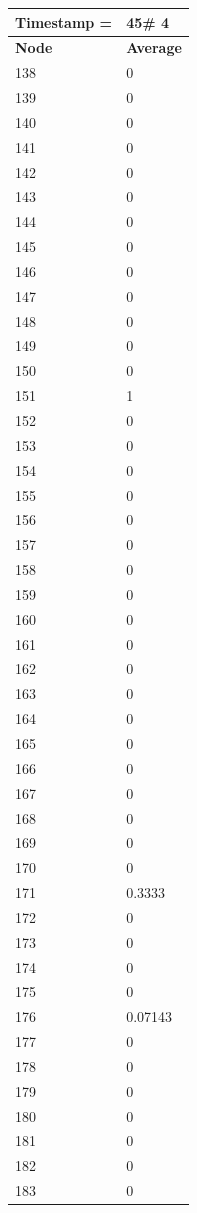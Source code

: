 \begin{tabular}{|l||l|}
\hline
\textbf{Timestamp =} & \textbf{45}\# 4\\\hline
	\textbf{Node} & \textbf{Average} \\ \hline
\hline
	138 & 0 \\ \hline
	139 & 0 \\ \hline
	140 & 0 \\ \hline
	141 & 0 \\ \hline
	142 & 0 \\ \hline
	143 & 0 \\ \hline
	144 & 0 \\ \hline
	145 & 0 \\ \hline
	146 & 0 \\ \hline
	147 & 0 \\ \hline
	148 & 0 \\ \hline
	149 & 0 \\ \hline
	150 & 0 \\ \hline
	151 & 1 \\ \hline
	152 & 0 \\ \hline
	153 & 0 \\ \hline
	154 & 0 \\ \hline
	155 & 0 \\ \hline
	156 & 0 \\ \hline
	157 & 0 \\ \hline
	158 & 0 \\ \hline
	159 & 0 \\ \hline
	160 & 0 \\ \hline
	161 & 0 \\ \hline
	162 & 0 \\ \hline
	163 & 0 \\ \hline
	164 & 0 \\ \hline
	165 & 0 \\ \hline
	166 & 0 \\ \hline
	167 & 0 \\ \hline
	168 & 0 \\ \hline
	169 & 0 \\ \hline
	170 & 0 \\ \hline
	171 & 0.3333 \\ \hline
	172 & 0 \\ \hline
	173 & 0 \\ \hline
	174 & 0 \\ \hline
	175 & 0 \\ \hline
	176 & 0.07143 \\ \hline
	177 & 0 \\ \hline
	178 & 0 \\ \hline
	179 & 0 \\ \hline
	180 & 0 \\ \hline
	181 & 0 \\ \hline
	182 & 0 \\ \hline
	183 & 0 \\ \hline
\end{tabular}
